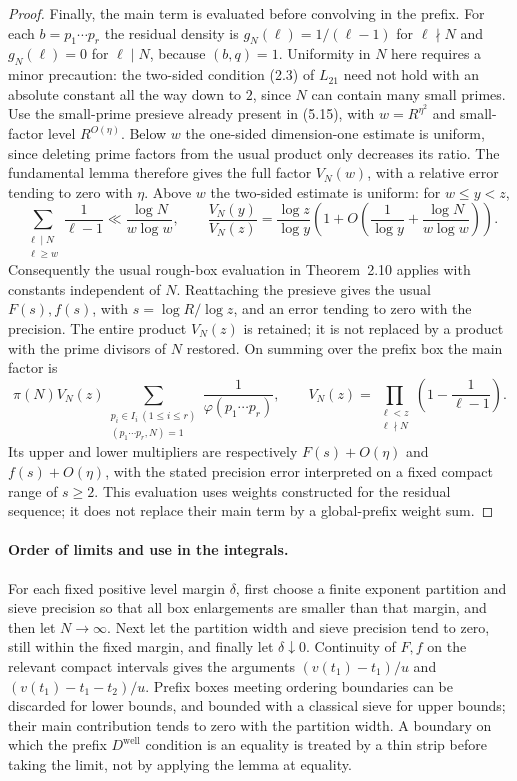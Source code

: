 \documentclass[11pt]{article}
\begin{document}
\begin{proof}
Finally, the main term is evaluated before convolving in the prefix.
For each $b=p_1\cdots p_r$ the residual density is
$g_N(\ell)=1/(\ell-1)$ for $\ell\nmid N$ and $g_N(\ell)=0$
for $\ell\mid N$, because $(b,q)=1$. Uniformity in $N$ here
requires a minor precaution: the two-sided condition (2.3) of
$L_{21}$ need not hold with an absolute constant all the way down
to $2$, since $N$ can contain many small primes.
Use the small-prime presieve already present in (5.15), with
$w=R^{\eta^2}$ and small-factor level $R^{O(\eta)}$.
Below $w$ the one-sided dimension-one estimate is uniform, since
deleting prime factors from the usual product only decreases its
ratio. The fundamental lemma therefore gives the full factor
$V_N(w)$, with a relative error tending to zero with $\eta$.
Above $w$ the two-sided estimate is uniform: for $w\le y<z$,
\[
 \sum_{\substack{\ell\mid N\\\ell\ge w}}
       \frac1{\ell-1}
 \ll\frac{\log N}{w\log w},\qquad
 \frac{V_N(y)}{V_N(z)}
 =\frac{\log z}{\log y}
   \left(1+O\!\left(\frac1{\log y}
                    +\frac{\log N}{w\log w}\right)\right).
\]
Consequently the usual rough-box evaluation in Theorem~2.10
applies with constants independent of $N$. Reattaching the
presieve gives the usual $F(s),f(s)$, with
$s=\log R/\log z$, and an error tending to zero with the precision.
The entire product $V_N(z)$ is retained; it is not replaced by a
product with the prime divisors of $N$ restored. On summing over
the prefix box the main factor is
\[
 \pi(N)V_N(z)
 \sum_{\substack{p_i\in I_i\ (1\le i\le r)\\(p_1\cdots p_r,N)=1}}
       \frac1{\varphi(p_1\cdots p_r)},
 \qquad
 V_N(z)=\prod_{\substack{\ell<z\\\ell\nmid N}}
       \left(1-\frac1{\ell-1}\right).
\]
Its upper and lower multipliers are respectively
$F(s)+O(\eta)$ and $f(s)+O(\eta)$, with the stated precision
error interpreted on a fixed compact range of $s\ge2$.
This evaluation uses weights constructed for the residual sequence;
it does not replace their main term by a global-prefix weight sum.
\end{proof}

\paragraph{Order of limits and use in the integrals.}
For each fixed positive level margin $\delta$, first choose a finite
exponent partition and sieve precision so that all box enlargements
are smaller than that margin, and then let $N\to\infty$.
Next let the partition width and sieve precision tend to zero,
still within the fixed margin, and finally let $\delta\downarrow0$.
Continuity of $F,f$ on the relevant compact intervals gives the
arguments $(v(t_1)-t_1)/u$ and
$(v(t_1)-t_1-t_2)/u$. Prefix boxes meeting ordering boundaries
can be discarded for lower bounds, and bounded with a classical
sieve for upper bounds; their main contribution tends to zero with
the partition width. A boundary on which the prefix
$D^{\mathrm{well}}$ condition is an equality is treated by a thin
strip before taking the limit, not by applying the lemma at equality.
\end{document}
